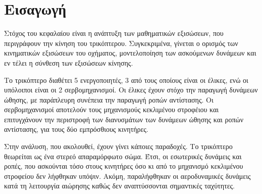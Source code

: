 \section{Εισαγωγή}
\noindent Στόχος του κεφαλαίου είναι η ανάπτυξη των μαθηματικών εξισώσεων, που 
περιγράφουν την κίνηση του τρικόπτερου. Συγκεκριμένα, γίνεται ο ορισμός των 
κινηματικών εξισώσεων του οχήματος, μοντελοποίηση των ασκούμενων δυνάμεων και εν 
τέλει η σύνθεση των εξισώσεων κίνησης. 

Το τρικόπτερο διαθέτει 5 ενεργοποιητές, 3 από τους οποίους είναι οι έλικες, ενώ
οι υπόλοιποι είναι οι 2 σερβομηχανισμοί. Οι έλικες έχουν στόχο την παραγωγή 
δυνάμεων ώθησης, με παράπλευρη συνέπεια την παραγωγή ροπών αντίστασης. Οι 
σερβομηχανισμοί αποτελούν τους μηχανισμούς κεκλιμένου στροφέιου και επιτυγχάνουν
την περιστροφή των διανυσμάτων των δυνάμεων ώθησης και ροπών αντίστασης, για 
τους δύο εμπρόσθιους κινητήρες. 

Στην ανάλυση, που ακολουθεί, έχουν γίνει κάποιες παραδοχές. Το τρικόπτερο 
θεωρείται ως ένα στερεό απαραμόρφωτο σώμα. Έτσι, οι εσωτερικές δυνάμεις και 
ροπές, που ασκούνται τόσο στους κινητήρες όσο κι από το μηχανισμό κεκλιμένου 
στροφείου δεν λήφθηκαν υπόψιν. Ακόμη, παραλήφθηκαν οι αεροδυναμικές δυνάμεις 
κατά τη λειτουργία αιώρησης καθώς δεν αναπτύσσονται σημαντικές ταχύτητες.
